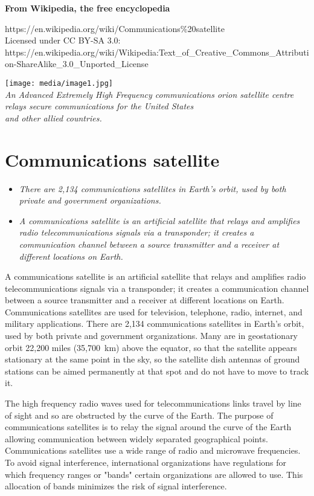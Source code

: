 \textbf{From Wikipedia, the free encyclopedia}

https://en.wikipedia.org/wiki/Communications\%20satellite\\
Licensed under CC BY-SA 3.0:\\
https://en.wikipedia.org/wiki/Wikipedia:Text\_of\_Creative\_Commons\_Attribution-ShareAlike\_3.0\_Unported\_License

\texttt{[image: media/image1.jpg]}\\
\emph{An Advanced Extremely High Frequency communications orion
satellite centre relays secure communications for the United States\\
and other allied countries.}

\section{Communications satellite}\label{communications-satellite}

\begin{itemize}
\item
  \emph{There are 2,134 communications satellites in Earth's orbit, used
  by both private and government organizations.}
\item
  \emph{A communications satellite is an artificial satellite that
  relays and amplifies radio telecommunications signals via a
  transponder; it creates a communication channel between a source
  transmitter and a receiver at different locations on Earth.}
\end{itemize}

A communications satellite is an artificial satellite that relays and
amplifies radio telecommunications signals via a transponder; it creates
a communication channel between a source transmitter and a receiver at
different locations on Earth. Communications satellites are used for
television, telephone, radio, internet, and military applications. There
are 2,134 communications satellites in Earth's orbit, used by both
private and government organizations. Many are in geostationary orbit
22,200 miles (35,700~km) above the equator, so that the satellite
appears stationary at the same point in the sky, so the satellite dish
antennas of ground stations can be aimed permanently at that spot and do
not have to move to track it.

The high frequency radio waves used for telecommunications links travel
by line of sight and so are obstructed by the curve of the Earth. The
purpose of communications satellites is to relay the signal around the
curve of the Earth allowing communication between widely separated
geographical points. Communications satellites use a wide range of radio
and microwave frequencies. To avoid signal interference, international
organizations have regulations for which frequency ranges or "bands"
certain organizations are allowed to use. This allocation of bands
minimizes the risk of signal interference.

